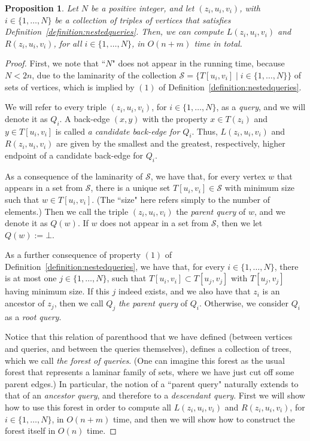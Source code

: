 \documentclass[11pt,a4paper]{article}
\newtheorem{proposition}[theorem]{Proposition}
\begin{document}
\begin{proposition}
\label{proposition:leftmostinsegment}
Let $N$ be a positive integer, and let $(z_i,u_i,v_i)$, with $i\in\{1,\dots,N\}$ be a collection of triples of vertices that satisfies Definition~\ref{definition:nestedqueries}. Then, we can compute $L(z_i,u_i,v_i)$ and $R(z_i,u_i,v_i)$, for all $i\in\{1,\dots,N\}$, in $O(n+m)$ time in total.
\end{proposition}
\begin{proof}
First, we note that ``$N$" does not appear in the running time, because $N< 2n$, due to the laminarity of the collection $\mathcal{S}=\{T[u_i,v_i]\mid i\in\{1,\dots,N\}\}$ of sets of vertices, which is implied by $(1)$ of Definition~\ref{definition:nestedqueries}.

We will refer to every triple $(z_i,u_i,v_i)$, for $i\in\{1,\dots,N\}$, as a \emph{query}, and we will denote it as $Q_i$. A back-edge $(x,y)$ with the property $x\in T(z_i)$ and $y\in T[u_i,v_i]$ is called \emph{a candidate back-edge for $Q_i$}. Thus, $L(z_i,u_i,v_i)$ and $R(z_i,u_i,v_i)$ are given by the smallest and the greatest, respectively, higher endpoint of a candidate back-edge for $Q_i$.

As a consequence of the laminarity of $\mathcal{S}$, we have that, for every vertex $w$ that appears in a set from $\mathcal{S}$, there is a unique set $T[u_i,v_i]\in\mathcal{S}$ with minimum size such that $w\in T[u_i,v_i]$. (The ``size" here refers simply to the number of elements.) Then we call the triple $(z_i,u_i,v_i)$ the \emph{parent query} of $w$, and we denote it as $Q(w)$. If $w$ does not appear in a set from $\mathcal{S}$, then we let $Q(w):=\bot$.

As a further consequence of property $(1)$ of Definition~\ref{definition:nestedqueries}, we have that, for every $i\in\{1,\dots,N\}$, there is at most one  $j\in\{1,\dots,N\}$, such that $T[u_i,v_i]\subset T[u_j,v_j]$ with $T[u_j,v_j]$ having minimum size. If this $j$ indeed exists, and we also have that $z_i$ is an ancestor of $z_j$, then we call $Q_j$ \emph{the parent query} of $Q_i$. Otherwise, we consider $Q_i$ as a \emph{root query}.

Notice that this relation of parenthood that we have defined (between vertices and queries, and between the queries themselves), defines a collection of trees, which we call \emph{the forest of queries}. (One can imagine this forest as the usual forest that represents a laminar family of sets, where we have just cut off some parent edges.) In particular, the notion of a ``parent query" naturally extends to that of an \emph{ancestor query}, and therefore to a \emph{descendant query}. First we will show how to use this forest in order to compute all $L(z_i,u_i,v_i)$ and $R(z_i,u_i,v_i)$, for $i\in\{1,\dots,N\}$, in $O(n+m)$ time, and then we will show how to construct the forest itself in $O(n)$ time.


\end{proof}
\end{document}
